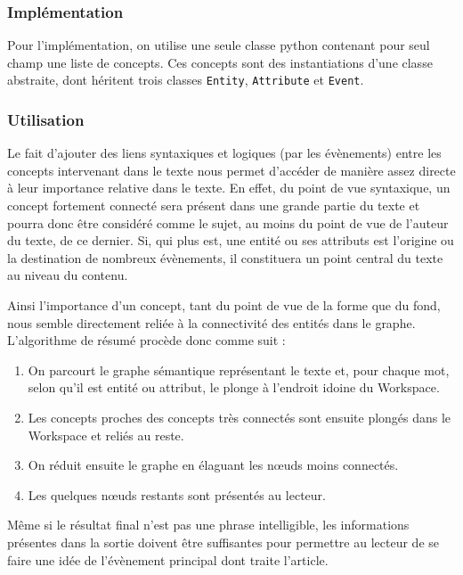 \documentclass[a4paper, 12pt]{article}
\newcommand{\pyt}[1]{\texttt{#1}}%
\begin{document}
\subsubsection{Implémentation}

Pour l'implémentation, on utilise une seule classe python contenant pour seul champ une liste de concepts. Ces concepts sont des instantiations d'une classe abstraite, dont héritent trois classes \pyt{Entity}, \pyt{Attribute} et \pyt{Event}.


\subsubsection{Utilisation}

Le fait d'ajouter des liens syntaxiques et logiques (par les évènements) entre les concepts intervenant dans le texte nous permet d'accéder de manière assez directe à leur importance relative dans le texte. En effet, du point de vue syntaxique, un concept fortement connecté sera présent dans une grande partie du texte et pourra donc être considéré comme le sujet, au moins du point de vue de l'auteur du texte, de ce dernier. Si, qui plus est, une entité ou ses attributs est l'origine ou la destination de nombreux évènements, il constituera un point central du texte au niveau du contenu.

Ainsi l'importance d'un concept, tant du point de vue de la forme que du fond, nous semble directement reliée à la connectivité des entités dans le graphe. L'algorithme de résumé procède donc comme suit :

\begin{enumerate}
	\item On parcourt le graphe sémantique représentant le texte et, pour chaque mot, selon qu'il est entité ou attribut, le plonge à l'endroit idoine du Workspace.
	\item Les concepts proches des concepts très connectés sont ensuite plongés dans le Workspace et reliés au reste.
	\item On réduit ensuite le graphe en élaguant les nœuds moins connectés.
	\item Les quelques nœuds restants sont présentés au lecteur.
\end{enumerate}

Même si le résultat final n'est pas une phrase intelligible, les informations présentes dans la sortie doivent être suffisantes pour permettre au lecteur de se faire une idée de l'évènement principal dont traite l'article.
\end{document}
